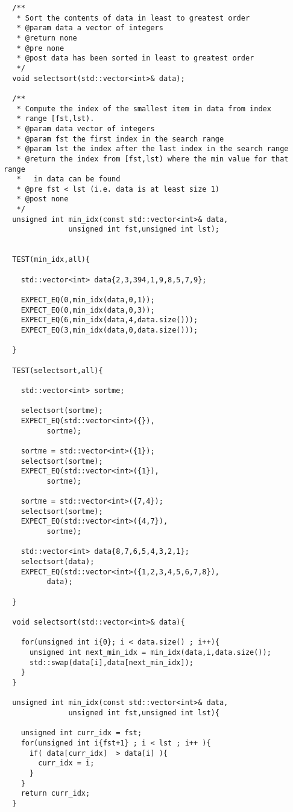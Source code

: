 \documentclass[]{tufte-handout}
\begin{document}
\begin{verbatim}
  /**
   * Sort the contents of data in least to greatest order
   * @param data a vector of integers
   * @return none
   * @pre none
   * @post data has been sorted in least to greatest order
   */
  void selectsort(std::vector<int>& data);  

  /**
   * Compute the index of the smallest item in data from index
   * range [fst,lst).
   * @param data vector of integers 
   * @param fst the first index in the search range
   * @param lst the index after the last index in the search range
   * @return the index from [fst,lst) where the min value for that range
   *   in data can be found
   * @pre fst < lst (i.e. data is at least size 1)
   * @post none
   */
  unsigned int min_idx(const std::vector<int>& data,
		       unsigned int fst,unsigned int lst);
	
		       
  TEST(min_idx,all){
    
    std::vector<int> data{2,3,394,1,9,8,5,7,9};

    EXPECT_EQ(0,min_idx(data,0,1));
    EXPECT_EQ(0,min_idx(data,0,3));
    EXPECT_EQ(6,min_idx(data,4,data.size()));
    EXPECT_EQ(3,min_idx(data,0,data.size()));    
  
  }

  TEST(selectsort,all){
    
    std::vector<int> sortme;

    selectsort(sortme);
    EXPECT_EQ(std::vector<int>({}),
	      sortme);

    sortme = std::vector<int>({1});
    selectsort(sortme);
    EXPECT_EQ(std::vector<int>({1}),
	      sortme);

    sortme = std::vector<int>({7,4});
    selectsort(sortme);
    EXPECT_EQ(std::vector<int>({4,7}),
	      sortme);

    std::vector<int> data{8,7,6,5,4,3,2,1};
    selectsort(data);
    EXPECT_EQ(std::vector<int>({1,2,3,4,5,6,7,8}),
	      data);

  }
  
  void selectsort(std::vector<int>& data){
    
    for(unsigned int i{0}; i < data.size() ; i++){
      unsigned int next_min_idx = min_idx(data,i,data.size());
      std::swap(data[i],data[next_min_idx]);
    }
  }
  
  unsigned int min_idx(const std::vector<int>& data,
		       unsigned int fst,unsigned int lst){
    
    unsigned int curr_idx = fst;
    for(unsigned int i{fst+1} ; i < lst ; i++ ){
      if( data[curr_idx]  > data[i] ){
     	curr_idx = i;
      }
    }
    return curr_idx;
  }
		       
\end{verbatim}
\end{document}
